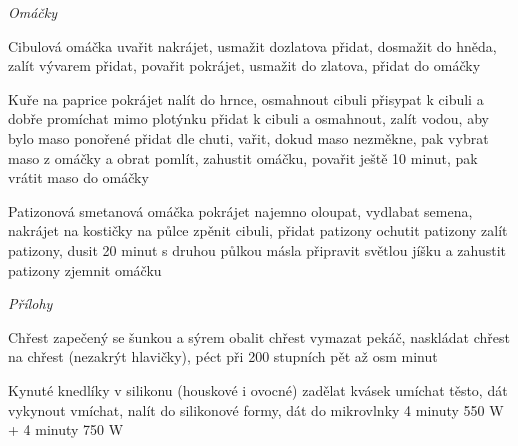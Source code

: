 \documentclass[12pt,a4paper]{article}
\begin{document}
\vspace*{\fill}
\hfill {\Huge\it Omáčky}\hfill
\vspace*{\fill}
\newpage

\begin{recipe}{Cibulová omáčka}
   uvařit
  nakrájet, usmažit dozlatova
  přidat, dosmažit do hněda, zalít vývarem
   přidat, povařit
  pokrájet, usmažit do zlatova, přidat do omáčky
\end{recipe}
\newpage

\begin{recipe}{Kuře na paprice}
   pokrájet
   nalít do hrnce, osmahnout cibuli
   přisypat k cibuli a dobře promíchat mimo plotýnku
   přidat k cibuli a osmahnout, zalít vodou, aby bylo maso ponořené
   přidat dle chuti, vařit, dokud maso nezměkne, pak vybrat maso z omáčky a obrat
   pomlít, zahustit omáčku, povařit ještě 10 minut, pak vrátit maso do omáčky
\end{recipe}
\newpage

\begin{recipe}{Patizonová smetanová omáčka}
   pokrájet najemno
   oloupat, vydlabat semena, nakrájet na kostičky
   na půlce zpěnit cibuli, přidat patizony
   ochutit patizony
   zalít patizony, dusit 20 minut
   s druhou půlkou másla připravit světlou jíšku a zahustit patizony
   zjemnit omáčku
\end{recipe}
\newpage

\vspace*{\fill}
\hfill {\Huge\it Přílohy}\hfill
\vspace*{\fill}
\newpage

\begin{recipe}{Chřest zapečený se šunkou a sýrem}
   obalit chřest
   vymazat pekáč, naskládat chřest
   na chřest (nezakrýt hlavičky), péct při 200 stup\-ních pět až osm minut
\end{recipe}
\newpage

\begin{recipe}{Kynuté knedlíky v silikonu (houskové i ovocné)}
   zadělat kvásek
   umíchat těsto, dát vykynout
   vmíchat, nalít do silikonové formy, dát do mikrovlnky 4 minuty 550 W + 4 minuty 750 W
\end{recipe}
\newpage
\end{document}

